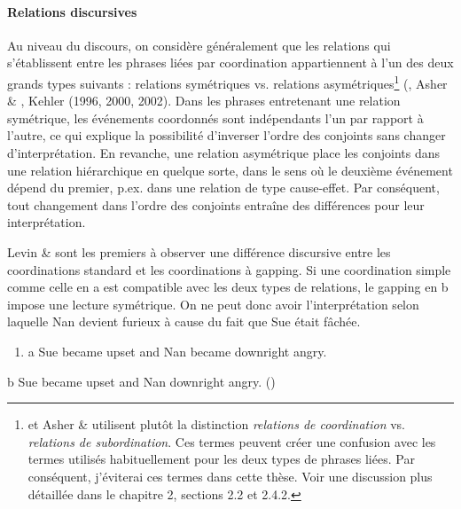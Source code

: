 \paragraph[Relations discursives]{Relations discursives}
Au niveau du discours, on considère généralement que les relations qui s'établissent entre les phrases liées par coordination appartiennent à l'un des deux grands types suivants : relations symétriques vs. relations asymétriques\footnote{\citet{Asher1993} et Asher \& \citet{Lascarides2003} utilisent plutôt la distinction \textit{relations de coordination} vs. \textit{relations de subordination}. Ces termes peuvent créer une confusion avec les termes utilisés habituellement pour les deux types de phrases liées. Par conséquent, j'éviterai ces termes dans cette thèse. Voir une discussion plus détaillée dans le chapitre 2, sections 2.2 et 2.4.2. }  (\citet{Asher1993}, Asher \& \citet{Lascarides2003}, Kehler (1996, 2000, 2002). Dans les phrases entretenant une relation symétrique, les événements coordonnés sont indépendants l'un par rapport à l'autre, ce qui explique la possibilité d'inverser l'ordre des conjoints sans changer d'interprétation. En revanche, une relation asymétrique place les conjoints dans une relation hiérarchique en quelque sorte, dans le sens où le deuxième événement dépend du premier, p.ex. dans une relation de type cause-effet. Par conséquent, tout changement dans l'ordre des conjoints entraîne des différences pour leur interprétation.  

Levin \& \citet{Prince1986} sont les premiers à observer une différence discursive entre les coordinations standard et les coordinations à gapping. Si une coordination simple comme celle en a est compatible avec les deux types de relations, le gapping en b impose une lecture symétrique. On ne peut donc avoir l'interprétation selon laquelle Nan devient furieux à cause du fait que Sue était fâchée. 


\begin{enumerate}
\item \label{bkm:Ref289606047}a   Sue became upset and Nan became downright angry.


\end{enumerate}
b  Sue became upset and Nan downright angry.        (\citet[83]{Kehler2002}) 

